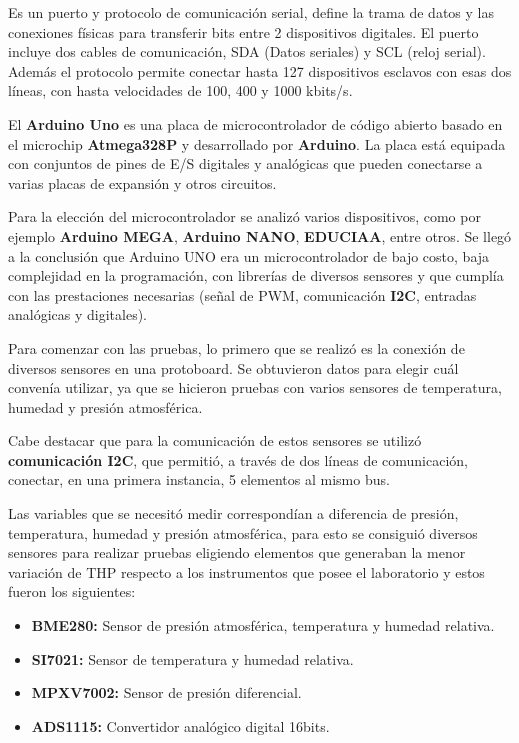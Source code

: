 \begin{tcolorbox}[colback=blue!5!white,colframe=blue!75!black,title=I2C]
	Es un puerto y protocolo de comunicación serial, define la trama de datos y las conexiones físicas para transferir bits entre 2 dispositivos digitales. El puerto incluye dos cables de comunicación, SDA (Datos seriales) y SCL (reloj serial). Además el protocolo permite conectar hasta 127 dispositivos esclavos con esas dos líneas, con hasta velocidades de 100, 400 y 1000 kbits/s. \end{tcolorbox}

\begin{tcolorbox}[colback=blue!5!white,colframe=blue!75!black,title=Arduino] El\textbf{ Arduino Uno} es una placa de microcontrolador de código abierto basado en el microchip \textbf{Atmega328P} y desarrollado por \textbf{Arduino}. La placa está equipada con conjuntos de pines de E/S digitales y analógicas que pueden conectarse a varias placas de expansión y otros circuitos.
   \end{tcolorbox}

	

Para la elección del microcontrolador se analizó varios dispositivos, como por ejemplo \textbf{Arduino MEGA}, \textbf{Arduino NANO}, \textbf{EDUCIAA}, entre otros. Se llegó a la conclusión que Arduino UNO era un microcontrolador de bajo costo, baja complejidad en la programación, con librerías de diversos sensores y que cumplía con las prestaciones necesarias (señal de PWM, comunicación \textbf{I2C}, entradas analógicas y digitales).


Para comenzar con las pruebas, lo primero que se realizó es la conexión de diversos sensores en una protoboard. Se obtuvieron datos para elegir cuál  convenía utilizar, ya que se hicieron pruebas con varios sensores de temperatura, humedad y presión atmosférica.


Cabe destacar que para la comunicación de estos sensores se utilizó \textbf{comunicación I2C}, que permitió, a través de dos líneas de comunicación, conectar, en una primera instancia,  5 elementos al mismo bus.

Las variables que se necesitó medir correspondían a diferencia de presión, temperatura, humedad y presión atmosférica, para esto se consiguió diversos sensores para realizar pruebas eligiendo elementos que generaban la menor variación de THP respecto a los instrumentos que posee el laboratorio y estos fueron los siguientes:

\begin{itemize}
	\item  \textbf{BME280:} Sensor de presión atmosférica, temperatura y humedad relativa.
	\item \textbf{SI7021:} Sensor de temperatura y humedad relativa.
	\item \textbf{MPXV7002:} Sensor de presión diferencial.
	\item \textbf{ADS1115:} Convertidor analógico digital 16bits.
\end{itemize}


